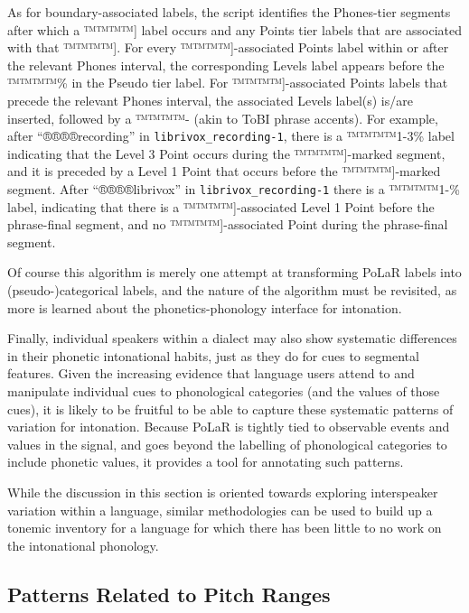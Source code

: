 \documentclass[11pt, twoside]{memoir}
\begin{document}
\begin{infobox}[frametitle=\textbf{Generating “Pseudo-Categorical” Labels from PoLaR Labels}]
	As for boundary-associated labels, the script identifies the Phones-tier segments after which a ™™™™{]} label occurs and any Points tier labels that are associated with that ™™™™{]}. For every ™™™™{]}-associated Points label within or after the relevant Phones interval, the corresponding Levels label appears before the ™™™™{\%} in the Pseudo tier label. For ™™™™{]}-associated Points labels that precede the relevant Phones interval, the associated Levels label(s) is/are inserted, followed by a ™™™™{-} (akin to ToBI phrase accents). For example, after “®®®®{recording}” in \texttt{librivox\_recording-1}, there is a ™™™™{1-3\%} label indicating that the Level 3 Point occurs during the ™™™™{]}-marked segment, and it is preceded by a Level 1 Point that occurs before the ™™™™{]}-marked segment. After “®®®®{librivox}” in \texttt{librivox\_recording-1} there is a ™™™™{1-\%} label, indicating that there is a ™™™™{]}-associated Level 1 Point before the phrase-final segment, and no ™™™™{]}-associated Point during the phrase-final segment.

	Of course this algorithm is merely one attempt at transforming PoLaR labels into (pseudo-)categorical labels, and the nature of the algorithm must be revisited, as more is learned about the phonetics-phonology interface for intonation.
\end{infobox}

Finally, individual speakers within a dialect may also show systematic differences in their phonetic intonational habits, just as they do for cues to segmental features.  Given the increasing evidence that language users attend to and manipulate individual cues to phonological categories (and the values of those cues), it is likely to be fruitful to be able to capture these systematic patterns of variation for intonation.  Because PoLaR is tightly tied to observable events and values in the signal, and goes beyond the labelling of phonological categories to include phonetic values, it provides a tool for annotating such patterns.

While the discussion in this section is oriented towards exploring interspeaker variation within a language, similar methodologies can be used to build up a tonemic inventory for a language for which there has been little to no work on the intonational phonology.

\subsection{Patterns Related to Pitch Ranges}\label{sec:pitch-ranges}
\end{document}
